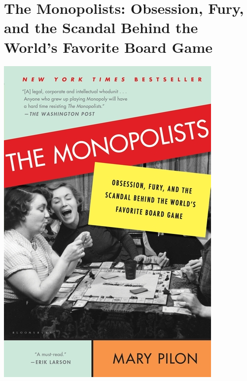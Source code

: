 \documentclass{tufte-handout}
\makeatletter
\newcommand{\varcaption}[2][0pt]{%
  \gsetlength{\@tufte@caption@vertical@offset}{-#1}%
  \gdef\@tufte@stored@varcaption{#2}%
}
\gdef\@tufte@stored@varcaption{} %
\makeatother
\begin{document}
\section*{The Monopolists: Obsession, Fury, and the Scandal \newline Behind the World's Favorite Board Game}
\begin{marginfigure}[\baselineskip]
   \includegraphics[width=\linewidth]{images/monopolists.jpg}
   \varcaption{\href{https://www.bloomsbury.com/us/the-monopolists-9781608199655/}{Publisher Link}, \href{https://www.amazon.com/Monopolists-Obsession-Scandal-Behind-Favorite/dp/1608199657/}{Amazon Link}}
\end{marginfigure}
\end{document}
